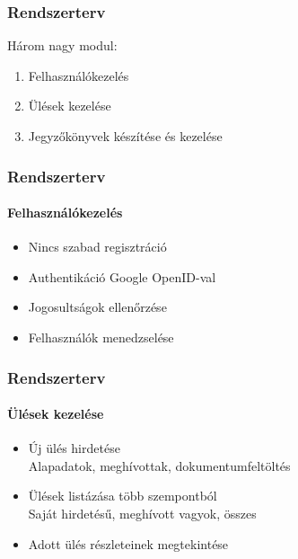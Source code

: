 \documentclass[11pt]{beamer}
\begin{document}
\begin{frame}
    \frametitle{Rendszerterv}
    
    Három nagy modul:
    
    \begin{enumerate}
        \item Felhasználókezelés
        \item Ülések kezelése
        \item Jegyzőkönyvek készítése és kezelése
    \end{enumerate}
\end{frame}

\begin{frame}
    \frametitle{Rendszerterv}
    \framesubtitle{Felhasználókezelés}
    
    \begin{itemize}
        \item Nincs szabad regisztráció
        \item Authentikáció Google OpenID-val
        \item Jogosultságok ellenőrzése
        \item Felhasználók menedzselése
    \end{itemize}
\end{frame}

\begin{frame}
    \frametitle{Rendszerterv}
    \framesubtitle{Ülések kezelése}
    
    \begin{itemize}
	    \item Új ülés hirdetése\\
	        \small{Alapadatok, meghívottak, dokumentumfeltöltés}
	        
	    \item Ülések listázása több szempontból\\
	        \small{Saját hirdetésű, meghívott vagyok, összes}
	        
        \item Adott ülés részleteinek megtekintése
    \end{itemize}
\end{frame}
\end{document}
